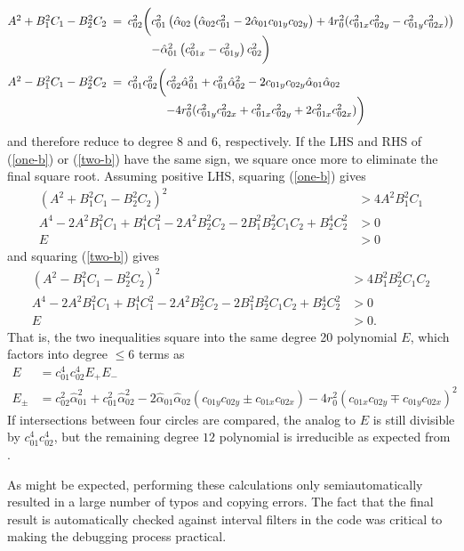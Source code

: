 \documentclass[11pt]{article}
\newcommand{\halpha}{\hat{\alpha}}
\begin{document}
\begin{align*}
\begin{array}{@{}r} A^2 + B_1^2 C_1 - B_2^2 C_2 \phantom{\bigg(} \hspace{-.5em}= \\ \phantom{\bigg(} \end{array}&%
\begin{array}{@{}r@{}l@{}} c_{02}^2 \bigg(& c_{01}^2 \left(\halpha_{02} \left(\halpha_{02} c_{01}^2 - 2 \halpha_{01} c_{01y} c_{02y}\right)
  + 4 r_0^2 (c_{01x}^2 c_{02y}^2 - c_{01y}^2 c_{02x}^2)\right) \\
  &- \halpha_{01}^2 \left(c_{01x}^2 - c_{01y}^2\right) c_{02}^2 \bigg) \end{array} \\
\begin{array}{@{}r} A^2 - B_1^2 C_1 - B_2^2 C_2 \phantom{\bigg(} \hspace{-.5em}= \\ \phantom{\bigg(} \end{array}&%
\begin{array}{@{}r@{}l@{}} c_{01}^2 c_{02}^2 \bigg(& c_{02}^2 \halpha_{01}^2 + c_{01}^2 \halpha_{02}^2 - 2 c_{01y} c_{02y} \halpha_{01} \halpha_{02} \\
  &- 4 r_0^2 (c_{01y}^2 c_{02x}^2 + c_{01x}^2 c_{02y}^2 + 2c_{01x}^2 c_{02x}^2) \bigg) \end{array}
\end{align*}
and therefore reduce to degree 8 and 6, respectively.  If the LHS and RHS of (\ref{one-b}) or (\ref{two-b}) have the same sign, we square once
more to eliminate the final square root.  Assuming positive LHS, squaring (\ref{one-b}) gives
\begin{align*}
(A^2 + B_1^2 C_1 - B_2^2 C_2)^2 &> 4 A^2 B_1^2 C_1 \\
A^4 - 2A^2 B_1^2 C_1 + B_1^4 C_1^2 - 2 A^2 B_2^2 C_2 - 2 B_1^2 B_2^2 C_1 C_2 + B_2^4 C_2^2 &> 0 \\
E &> 0 
\end{align*}
and squaring (\ref{two-b}) gives
\begin{align*}
(A^2 - B_1^2 C_1 - B_2^2 C_2)^2 &> 4 B_1^2 B_2^2 C_1 C_2 \\
A^4 - 2A^2 B_1^2 C_1 + B_1^4 C_1^2 - 2 A^2 B_2^2 C_2 - 2 B_1^2 B_2^2 C_1 C_2 + B_2^4 C_2^2 &> 0 \\
E &> 0.
\end{align*}
That is, the two inequalities square into the same degree 20 polynomial $E$, which factors into degree $\le 6$ terms as
\begin{align*}
E &= c_{01}^4 c_{02}^4 E_+ E_- \\
E_\pm &= c_{02}^2 \halpha_{01}^2 + c_{01}^2 \halpha_{02}^2 - 2 \halpha_{01} \halpha_{02} (c_{01y} c_{02y} \pm c_{01x} c_{02x}) - 4 r_0^2 (c_{01x} c_{02y} \mp c_{01y} c_{02x})^2
\end{align*}
If intersections between four circles are compared, the analog to $E$ is still divisible by $c_{01}^4 c_{02}^4$, but the remaining degree $12$ polynomial
is irreducible as expected from \cite{devillers2000algebraic}.

As might be expected, performing these calculations only semiautomatically resulted in a large number of typos and copying errors.  The fact that the final
result is automatically checked against interval filters in the code was critical to making the debugging process practical.
\end{document}
